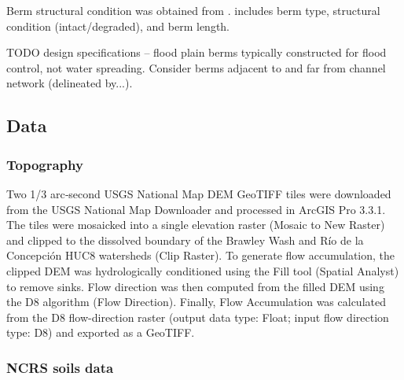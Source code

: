 \documentclass[review]{elsarticle}
\begin{document}
Berm structural condition was obtained from \citet{nichols2021landscape}. 
 \citet{nichols2021landscape} includes berm type, structural condition (intact/degraded), and berm length.
 
TODO design specifications -- flood plain berms typically constructed for flood control, not water spreading. 
Consider berms adjacent to and far from channel network (delineated by...).

\subsection{Data}

\subsubsection*{Topography}

Two 1/3 arc‑second USGS National Map DEM GeoTIFF tiles were downloaded from the USGS National Map Downloader and processed in ArcGIS Pro 3.3.1. The tiles were mosaicked into a single elevation raster (Mosaic to New Raster) and clipped to the dissolved boundary of the Brawley Wash and Río de la Concepción HUC8 watersheds (Clip Raster). To generate flow accumulation, the clipped DEM was hydrologically conditioned using the Fill tool (Spatial Analyst) to remove sinks. Flow direction was then computed from the filled DEM using the D8 algorithm (Flow Direction). Finally, Flow Accumulation was calculated from the D8 flow-direction raster (output data type: Float; input flow direction type: D8) and exported as a GeoTIFF.




\subsubsection*{NCRS soils data}
\end{document}

